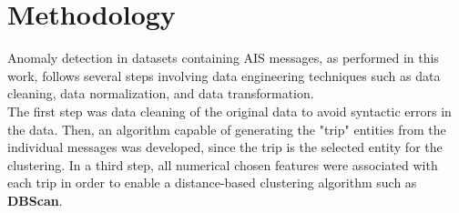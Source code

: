 \chapter{Methodology}

Anomaly detection in datasets containing AIS messages, as performed in this work, follows several steps involving data engineering techniques such as data cleaning, data normalization, and data transformation.
\\
The first step was data cleaning of the original data to avoid syntactic errors in the data. Then, an algorithm capable of generating the "trip" entities from the individual messages was developed, since the trip is the selected entity for the clustering. In a third step, all numerical chosen features were associated with each trip in order to enable a distance-based clustering algorithm such as \textbf{DBScan}.

